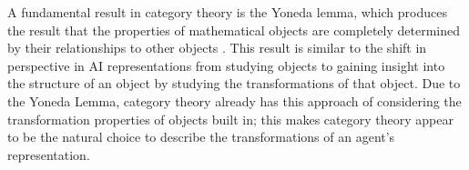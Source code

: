 A fundamental result in category theory is the Yoneda lemma, which produces the result that the properties of mathematical objects are completely determined by their relationships to other objects \autocite{riehl2017category,barr1990category}.
This result is similar to the shift in perspective in AI representations from studying objects to gaining insight into the structure of an object by studying the transformations of that object.
Due to the Yoneda Lemma, category theory already has this approach of considering the transformation properties of objects built in; this makes category theory appear to be the natural choice to describe the transformations of an agent's representation.


